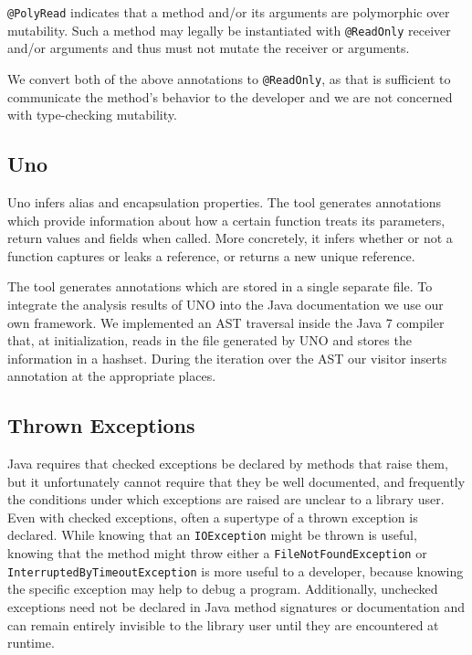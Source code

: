 \texttt{@PolyRead} indicates that a method and/or its arguments are polymorphic
over mutability. Such a method may legally be instantiated with
\texttt{@ReadOnly} receiver and/or arguments and thus must not mutate the
receiver or arguments.

We convert both of the above annotations to \texttt{@ReadOnly}, as
that is sufficient to communicate the method's behavior to the developer and we
are not concerned with type-checking mutability.

\subsection{Uno}

Uno infers alias and encapsulation properties.  The
tool generates annotations which provide information about how a certain
function treats its parameters, return values and fields when called. More
concretely, it infers whether or not a function captures or leaks a
reference, or returns a new unique reference.

The tool generates annotations which are stored in a single separate file. 
To integrate the analysis results of UNO into the Java documentation we
use our own framework. We implemented an AST traversal inside the Java 7 
compiler that, at initialization, reads in the file generated by UNO and 
stores the information in a hashset. During the iteration over the AST
our visitor inserts annotation at the appropriate places.

\subsection{Thrown Exceptions}

Java requires that checked exceptions be declared by methods that raise them,
but it unfortunately cannot require that they be well documented, and
frequently the conditions under which exceptions are raised are unclear to a
library user. Even with checked exceptions, often a supertype of a thrown
exception is declared.  While knowing that an \texttt{IOException} might be
thrown is useful, knowing that the method might throw either a
\texttt{FileNotFoundException} or \texttt{InterruptedByTimeoutException} is more
useful to a developer, because knowing the specific exception may help to debug
a program.  Additionally, unchecked exceptions need not be declared in Java method
signatures or documentation and can remain entirely invisible to the library
user until they are encountered at runtime.

